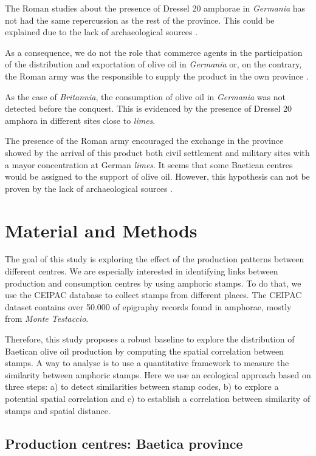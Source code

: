 \documentclass[review]{elsarticle}
\begin{document}
The Roman studies about the presence of Dressel 20 amphorae in \textit{Germania} has not had the same repercussion as the rest of the province. This could be explained due to the lack of archaeological sources \citep{horacio2010llegada}.
  
As a consequence, we do not the role that commerce agents in the participation of the distribution and exportation of olive oil in \textit{Germania} or, on the contrary, the Roman army was the responsible to supply the product in the own province \citep[156]{remesal_germn_2010}. 

As the case of \textit{Britannia}, the consumption of olive oil in \textit{Germania} was not detected before the conquest. This is evidenced by the presence of Dressel 20 amphora in different sites close to \textit{limes}. 

The presence of the Roman army encouraged the exchange in the province showed by the arrival of this product both civil settlement and military sites with a mayor concentration at German \textit{limes}. It seems that some Baetican centres would be assigned to the support of olive oil. However, this hypothesis can not be proven by the lack of archaeological sources \citep[125]{remesal_concierto}. 



\section{Material and Methods}


The goal of this study is exploring the effect of the production patterns between different centres. We are especially interested in identifying links between production and consumption centres by using amphoric stamps. To do that, we use the CEIPAC database to collect stamps from different places. The CEIPAC dataset contains over 50.000 of epigraphy records found in amphorae, mostly from \textit{Monte Testaccio}. 

Therefore, this study proposes a robust baseline to explore the distribution of Baetican olive oil production by computing the spatial correlation between stamps. A way to analyse is to use a quantitative framework to measure the similarity between amphoric stamps. Here we use an ecological approach based on three steps: a) to detect similarities between stamp codes, b) to explore a potential spatial correlation and c) to establish a correlation between similarity of stamps and spatial distance. 


\subsection{Production centres: Baetica province}
\end{document}

